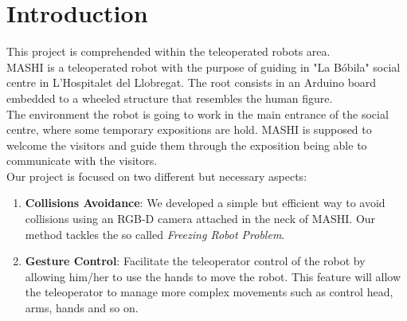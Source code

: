 \section{Introduction}
\label{introduction}

This project is comprehended within the teleoperated robots area.\\ 

MASHI is a teleoperated robot with the purpose of guiding in "La Bóbila" social centre in L'Hospitalet del Llobregat. The root consists in an Arduino board embedded to a wheeled structure that resembles the human figure.\\

The environment the robot is going to work in the main entrance of the social centre, where some temporary expositions are hold. MASHI is supposed to welcome the visitors and guide them through the exposition being able to communicate with the visitors.\\

Our project is focused on two different but necessary aspects:
\begin{enumerate}
	\item \textbf{Collisions Avoidance}: We developed a simple but efficient way to avoid collisions using an RGB-D camera attached in the neck of MASHI. Our method tackles the so called \emph{Freezing Robot Problem}.
	\item \textbf{Gesture Control}: Facilitate the teleoperator control of the robot by allowing him/her to use the hands to move the robot. This feature will allow the teleoperator to manage more complex movements such as control head, arms, hands and so on.
\end{enumerate}